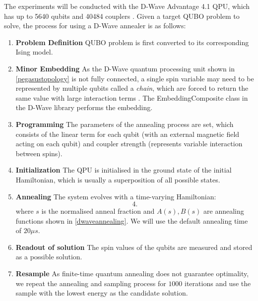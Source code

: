 The experiments will be conducted with the D-Wave Advantage 4.1 QPU, which has up to 5640 qubits and 40484 couplers \cite{dwaveadvantage}. Given a target QUBO problem to solve, the process for using a D-Wave annealer is as follows:
\begin{enumerate}
    \item \textbf{Problem Definition} QUBO problem is first converted to its corresponding Ising model.
    \item \textbf{Minor Embedding} As the D-Wave quantum processing unit shown in \autoref{pegasustopology} is not fully connected, a single spin variable may need to be represented by multiple qubits called a \textit{chain}, which are forced to return the same value with large interaction terms \cite{b16}. The EmbeddingComposite class in the D-Wave library performs the embedding.
    \item \textbf{Programming} The parameters of the annealing process are set, which consists of the linear term for each qubit (with an external magnetic field acting on each qubit) and coupler strength (represents variable interaction between spins).
    \item \textbf{Initialization} The QPU is initialised in the ground state of the initial Hamiltonian, which is usually a superposition of all possible states.
    \item \textbf{Annealing} The system evolves with a time-varying Hamiltonian:
    \begin{equation}
        \label{eqn:dwavehamiltonian}
        4.
    \end{equation}
    where $s$ is the normalised anneal fraction and $A(s), B(s)$ are annealing functions shown in \autoref{dwaveannealing}. We will use the default annealing time of $20\mu s$. 
    \item \textbf{Readout of solution} The spin values of the qubits are measured and stored as a possible solution.
    \item \textbf{Resample} As finite-time quantum annealing does not guarantee optimality, we repeat the annealing and sampling process for $1000$ iterations and use the sample with the lowest energy as the candidate solution.
\end{enumerate}

